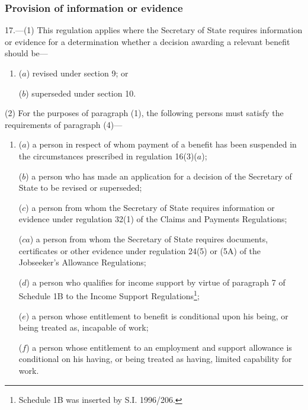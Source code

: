 \documentclass[12pt,a4paper]{article}
\begin{document}

\subsubsection[17. Provision of information or evidence]{Provision of information or evidence}

17.—(1) This regulation applies where the Secretary of State requires information or evidence for a determination whether a decision awarding a relevant benefit should be—
\begin{enumerate}\item[]
($a$) revised under section 9; or

($b$) superseded under section 10.
\end{enumerate}

(2) For the purposes of paragraph (1), the following persons must satisfy the requirements of paragraph (4)—
\begin{enumerate}\item[]
($a$) a person in respect of whom payment of a benefit has been suspended in the circumstances prescribed in regulation 16(3)($a$);

($b$) a person who has made an application for a decision of the Secretary of State to be revised or superseded;


($c$) a person from whom the Secretary of State requires information or evidence under regulation 32(1) of the Claims and Payments Regulations;

($ca$) a person from whom the Secretary of State requires documents, certificates or other evidence under regulation 24(5) or (5A) of the Jobseeker’s Allowance Regulations;

($d$) a person who qualifies for income support by virtue of paragraph 7 of Schedule 1B to the Income Support Regulations\footnote{\frenchspacing Schedule 1B was inserted by S.I. 1996/206.};

($e$) a person whose entitlement to benefit is conditional upon his being, or being treated as, incapable of work;

($f$) a person whose entitlement to an employment and support allowance is conditional on his having, or being treated as having, limited capability for work.
\end{enumerate}
\end{document}
